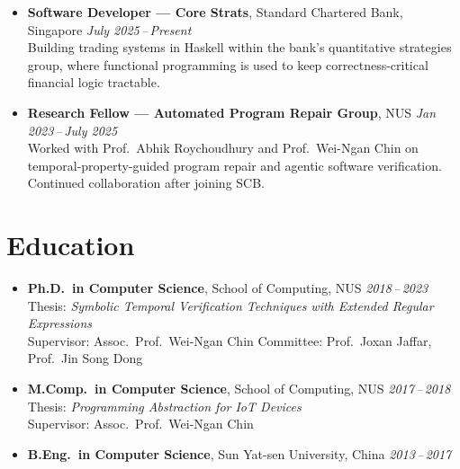 \documentclass[11pt, a4paper]{article}
\begin{document}
\begin{itemize}[leftmargin=0pt, label={}]

  \item \textbf{Software Developer --- Core Strats}, Standard Chartered Bank, Singapore
        \hfill \textit{July 2025\,--\,Present}\\
  Building trading systems in Haskell within the bank's quantitative strategies group, where
  functional programming is used to keep correctness-critical financial logic tractable.

  \item \textbf{Research Fellow --- Automated Program Repair Group},
        NUS
        \hfill \textit{Jan 2023\,--\,July 2025}\\
  Worked with Prof.\ Abhik Roychoudhury and Prof.\ Wei-Ngan Chin on temporal-property-guided program repair
 and agentic software verification. Continued collaboration after
  joining SCB.

\end{itemize}

\section{Education}

\begin{itemize}[leftmargin=0pt, label={}]

  \item \textbf{Ph.D.\ in Computer Science}, School of Computing, NUS
        \hfill \textit{2018\,--\,2023}\\
  Thesis: \emph{Symbolic Temporal Verification Techniques with Extended Regular Expressions}\\
  Supervisor: Assoc.\ Prof.\ Wei-Ngan Chin \qquad
  Committee: Prof.\ Joxan Jaffar, Prof.\ Jin Song Dong

  \item \textbf{M.Comp.\ in Computer Science}, School of Computing, NUS
        \hfill \textit{2017\,--\,2018}\\
  Thesis: \emph{Programming Abstraction for IoT Devices}\\
  Supervisor: Assoc.\ Prof.\ Wei-Ngan Chin

  \item \textbf{B.Eng.\ in Computer Science}, Sun Yat-sen University, China
        \hfill \textit{2013\,--\,2017}
\end{itemize}
\end{document}

